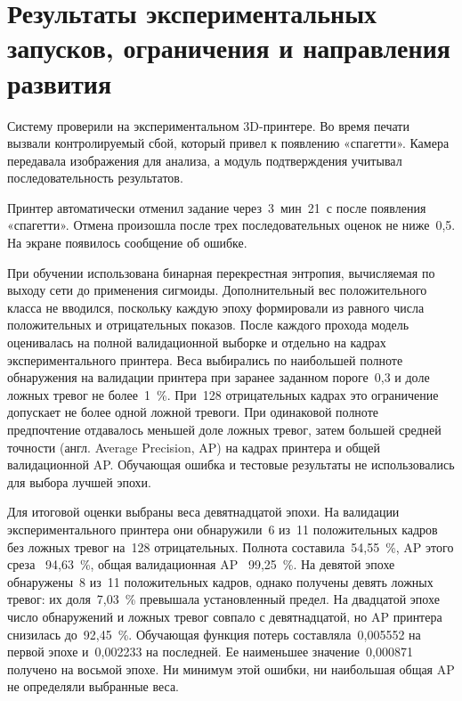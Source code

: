 \section{Результаты экспериментальных запусков, ограничения и направления развития}
\label{sec:experimental-results}


Систему проверили на экспериментальном 3D-принтере. Во время печати вызвали контролируемый сбой, который привел к появлению «спагетти». Камера передавала изображения для анализа, а модуль подтверждения учитывал последовательность результатов.

Принтер автоматически отменил задание через~3~мин~21~с после появления «спагетти». Отмена произошла после трех последовательных оценок не ниже~0,5. На экране появилось сообщение об ошибке.

При обучении использована бинарная перекрестная энтропия, вычисляемая по выходу сети до применения сигмоиды. Дополнительный вес положительного класса не вводился, поскольку каждую эпоху формировали из равного числа положительных и отрицательных показов. После каждого прохода модель оценивалась на полной валидационной выборке и отдельно на кадрах экспериментального принтера. Веса выбирались по наибольшей полноте обнаружения на валидации принтера при заранее заданном пороге~0,3 и доле ложных тревог не более~1~\%. При~128 отрицательных кадрах это ограничение допускает не более одной ложной тревоги. При одинаковой полноте предпочтение отдавалось меньшей доле ложных тревог, затем большей средней точности (англ. Average Precision, AP) на кадрах принтера и общей валидационной AP. Обучающая ошибка и тестовые результаты не использовались для выбора лучшей эпохи.

Для итоговой оценки выбраны веса девятнадцатой эпохи. На валидации экспериментального принтера они обнаружили~6 из~11 положительных кадров без ложных тревог на~128 отрицательных. Полнота составила~54,55~\%, AP этого среза~\textemdash{} 94,63~\%, общая валидационная AP~\textemdash{} 99,25~\%. На девятой эпохе обнаружены~8 из~11 положительных кадров, однако получены девять ложных тревог: их доля~7,03~\% превышала установленный предел. На двадцатой эпохе число обнаружений и ложных тревог совпало с девятнадцатой, но AP принтера снизилась до~92,45~\%. Обучающая функция потерь составляла~0,005552 на первой эпохе и~0,002233 на последней. Ее наименьшее значение~0,000871 получено на восьмой эпохе. Ни минимум этой ошибки, ни наибольшая общая AP не определяли выбранные веса.

